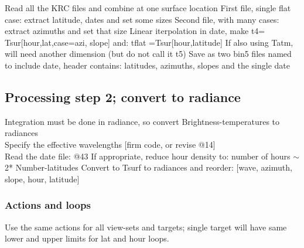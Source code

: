 \documentclass{article}
\begin{document}
\vspace{3mm}
Read all the KRC files and combine at one surface location
\qii First file, single flat case: extract latitude, dates and set some sizes 
\qii Second file, with many cases: extract azimuths and set that size 
\qi Linear iterpolation in date, make  t4= Tsur[hour,lat,case=azi, slope] 
\qi  and: tflat =Tsur[hour,latitude]
\qiii If also using Tatm, will need another dimension (but do not call it t5)
\qi Save as two bin5 files named to include date, 
\qii header contains: latitudes, azimuths, slopes and the single date

\subsection{Processing step 2; convert to radiance \label{s2}} 
Integration must be done in radiance, so convert Brightness-temperatures to radiances
\\ Specify the effective wavelengths [firm code, or revise @14]
\\ Read the date file: @43
\qii If appropriate, reduce hour density to: number of hours $\sim$ 2* Number-latitudes 
\qi Convert to Tsurf to radiances and reorder: [wave, azimuth, slope, hour, latitude] 

\subsubsection{Actions and loops}  %
Use the same actions for all view-sets and targets; single target will have same lower and upper limits for lat and hour loops. 
\end{document}
